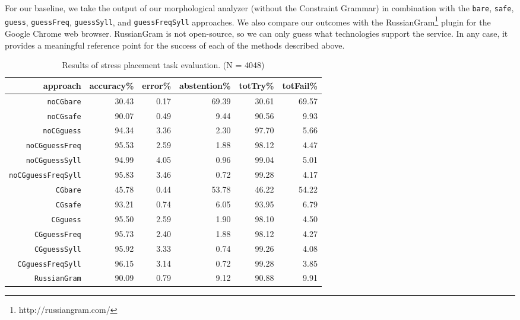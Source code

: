\documentclass[11pt]{article}
\begin{document}
For our baseline, we take the output of our morphological analyzer (without the 
Constraint Grammar) in combination with the {\small {\tt bare}}, 
{\small {\tt safe}}, {\small {\tt guess}}, {\small {\tt guessFreq}}, 
{\small {\tt guessSyll}}, and {\small {\tt guessFreqSyll}} approaches. We also 
compare our outcomes with the RussianGram\footnote{http://russiangram.com/} 
plugin for the Google Chrome web browser. RussianGram is not open-source, so we
can only guess what technologies support the service. In any case, it provides a
meaningful reference point for the success of each of the methods described 
above.

\begin{table*}[t]
  \centering
  \begin{tabular}{r | r r r | r r }
    approach & accuracy\% & error\% & abstention\% & totTry\% & totFail\% \\
    \hline
    \hline
    {\small {\tt noCGbare}} & 30.43 & 0.17 & 69.39 & 30.61 & 69.57 \\
    {\small {\tt noCGsafe}} & 90.07 & 0.49 & 9.44 & 90.56 & 9.93 \\
    {\small {\tt noCGguess}} & 94.34 & 3.36 & 2.30 & 97.70 & 5.66 \\
    {\small {\tt noCGguessFreq}} & 95.53 & 2.59 & 1.88 & 98.12 & 4.47 \\
    {\small {\tt noCGguessSyll}} & 94.99 & 4.05 & 0.96 & 99.04 & 5.01 \\
    {\small {\tt noCGguessFreqSyll}} & 95.83 & 3.46 & 0.72 & 99.28 & 4.17 \\
    \hline
    {\small {\tt CGbare}} & 45.78 & 0.44 & 53.78 & 46.22 & 54.22 \\
    {\small {\tt CGsafe}} & 93.21 & 0.74 & 6.05 & 93.95 & 6.79 \\
    {\small {\tt CGguess}} & 95.50 & 2.59 & 1.90 & 98.10 & 4.50 \\
    {\small {\tt CGguessFreq}} & 95.73 & 2.40 & 1.88 & 98.12 & 4.27 \\
    {\small {\tt CGguessSyll}} & 95.92 & 3.33 & 0.74 & 99.26 & 4.08 \\
    {\small {\tt CGguessFreqSyll}} & 96.15 & 3.14 & 0.72 & 99.28 & 3.85 \\
    \hline
    {\small {\tt RussianGram}} & 90.09 & 0.79 & 9.12 & 90.88 & 9.91
  \end{tabular}
  \caption{Results of stress placement task evaluation. (N = 4048)}
  \label{tab:results}
\end{table*}
\end{document}
